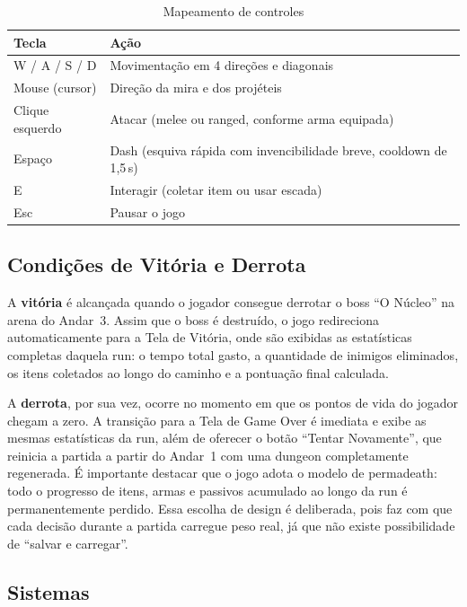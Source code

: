 \documentclass[12pt, a4paper]{article}
\begin{document}
\begin{table}[H]
  \centering
  \caption{Mapeamento de controles}
  \begin{tabularx}{0.85\textwidth}{l L}
    \toprule
    \textbf{Tecla} & \textbf{A\c{c}\~ao} \\
    \midrule
    W / A / S / D       & Movimenta\c{c}\~ao em 4 dire\c{c}\~oes e diagonais \\
    Mouse (cursor)      & Dire\c{c}\~ao da mira e dos proj\'eteis \\
    Clique esquerdo     & Atacar (melee ou ranged, conforme arma equipada) \\
    Espa\c{c}o          & Dash (esquiva r\'apida com invencibilidade breve, cooldown de 1,5\,s) \\
    E                   & Interagir (coletar item ou usar escada) \\
    Esc                 & Pausar o jogo \\
    \bottomrule
  \end{tabularx}
\end{table}

\subsection{Condi\c{c}\~oes de Vit\'oria e Derrota}

A \textbf{vit\'oria} \'e alcan\c{c}ada quando o jogador consegue derrotar o boss ``O N\'ucleo'' na arena do Andar~3. Assim que o boss \'e destru\'ido, o jogo redireciona automaticamente para a Tela de Vit\'oria, onde s\~ao exibidas as estat\'isticas completas daquela run: o tempo total gasto, a quantidade de inimigos eliminados, os itens coletados ao longo do caminho e a pontua\c{c}\~ao final calculada.

A \textbf{derrota}, por sua vez, ocorre no momento em que os pontos de vida do jogador chegam a zero. A transi\c{c}\~ao para a Tela de Game Over \'e imediata e exibe as mesmas estat\'isticas da run, al\'em de oferecer o bot\~ao ``Tentar Novamente'', que reinicia a partida a partir do Andar~1 com uma dungeon completamente regenerada. \'E importante destacar que o jogo adota o modelo de permadeath: todo o progresso de itens, armas e passivos acumulado ao longo da run \'e permanentemente perdido. Essa escolha de design \'e deliberada, pois faz com que cada decis\~ao durante a partida carregue peso real, j\'a que n\~ao existe possibilidade de ``salvar e carregar''.

\subsection{Sistemas}
\end{document}
